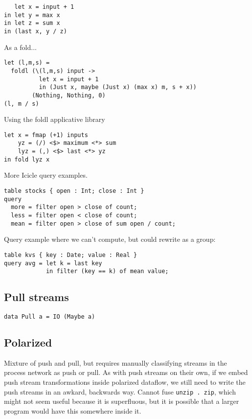 \begin{lstlisting}
   let x = input + 1
in let y = max x
in let z = sum x
in (last x, y / z)
\end{lstlisting}

As a fold...
\begin{lstlisting}
let (l,m,s) =
  foldl (\(l,m,s) input ->
          let x = input + 1
          in (Just x, maybe (Just x) (max x) m, s + x))
        (Nothing, Nothing, 0)
(l, m / s)
\end{lstlisting}

Using the foldl applicative library
\begin{lstlisting}
let x = fmap (+1) inputs
    yz = (/) <$> maximum <*> sum
    lyz = (,) <$> last <*> yz
in fold lyz x
\end{lstlisting}

More Icicle query examples.
\begin{lstlisting}
table stocks { open : Int; close : Int }
query
  more = filter open > close of count;
  less = filter open < close of count;
  mean = filter open > close of sum open / count;
\end{lstlisting}

Query example where we can't compute, but could rewrite as a group:
\begin{lstlisting}
table kvs { key : Date; value : Real }
query avg = let k = last key
            in filter (key == k) of mean value;
\end{lstlisting}


\subsection{Pull streams}

\begin{lstlisting}
data Pull a = IO (Maybe a)
\end{lstlisting}

\subsection{Polarized}
Mixture of push and pull, but requires manually classifying streams in the process network as push or pull.
As with push streams on their own, if we embed push stream transformations inside polarized dataflow, we still need to write the push streams in an awkard, backwards way.
Cannot fuse \lstinline/unzip . zip/, which might not seem useful because it is superfluous, but it is possible that a larger program would have this somewhere inside it.

